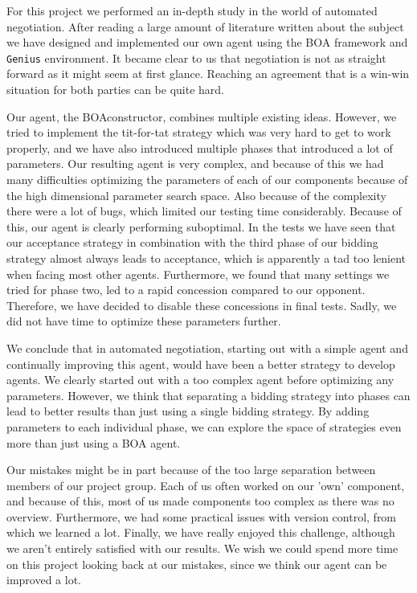 

For this project we performed an in-depth study in the world of automated negotiation. After reading a large amount of literature written about the subject we have designed and implemented our own agent using the BOA framework and \texttt{Genius} environment. It became clear to us that negotiation is not as straight forward as it might seem at first glance. Reaching an agreement that is a win-win situation for both parties can be quite hard.

Our agent, the BOAconstructor, combines multiple existing ideas.
However, we tried to implement the tit-for-tat strategy which was very hard to get to work properly, and we have also introduced multiple phases that introduced a lot of parameters. Our resulting agent is very complex, and because of this we had many difficulties optimizing the parameters of each of our components because of the high dimensional parameter search space.
Also because of the complexity there were a lot of bugs, which limited our testing time considerably. Because of this, our agent is clearly performing suboptimal. In the tests we have seen that our acceptance strategy in combination with the third phase of our bidding strategy almost always leads to acceptance, which is apparently a tad too lenient when facing most other agents. Furthermore, we found that many settings we tried for phase two, led to a rapid concession compared to our opponent.  Therefore, we have decided to disable these concessions in final tests. Sadly, we did not have time to optimize these parameters further.

We conclude that in automated negotiation, starting out with a simple agent and 
continually improving this agent, would have been a better strategy to develop agents. 
We clearly started out with a too complex agent before optimizing any parameters.
However, we think that separating a bidding strategy into phases can lead to 
better results than just using a single bidding strategy. By adding parameters
to each individual phase, we can explore the space of strategies even more
than just using a BOA agent.

Our mistakes might be in part because of the too large separation between members of our project group.
Each of us often worked on our 'own' component, and because of this, most of us made components too complex as there was no overview. Furthermore, we had some practical issues with version control, from which we learned a lot.
Finally, we have really enjoyed this challenge, although we aren't entirely satisfied with 
our results. We wish we could spend more time on this project looking back at our mistakes,
since we think our agent can be improved a lot.
 

